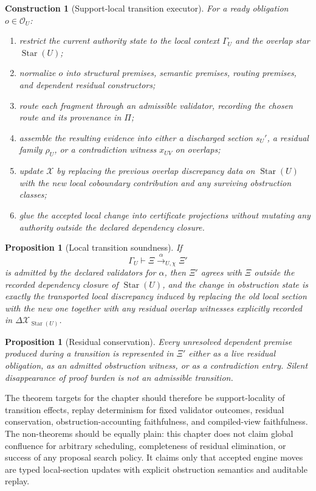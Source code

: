 \documentclass[11pt]{report}
\newtheorem{proposition}[definition]{Proposition}
\newtheorem{construction}[definition]{Construction}
\begin{document}
\begin{construction}[Support-local transition executor]
For a ready obligation $o \in \mathcal{O}_U$:
\begin{enumerate}
\item restrict the current authority state to the local context $\Gamma_U$ and the overlap star $\operatorname{Star}(U)$;
\item normalize $o$ into structural premises, semantic premises, routing premises, and dependent residual constructors;
\item route each fragment through an admissible validator, recording the chosen route and its provenance in $\Pi$;
\item assemble the resulting evidence into either a discharged section $s_U'$, a residual family $\rho_U$, or a contradiction witness $x_{UV}$ on overlaps;
\item update $\mathcal{X}$ by replacing the previous overlap discrepancy data on $\operatorname{Star}(U)$ with the new local coboundary contribution and any surviving obstruction classes;
\item glue the accepted local change into certificate projections without mutating any authority outside the declared dependency closure.
\end{enumerate}
\end{construction}

\begin{proposition}[Local transition soundness]
If
\[
\Gamma_U \vdash \Xi \xrightarrow{\alpha}_{U,\chi} \Xi'
\]
is admitted by the declared validators for $\alpha$, then $\Xi'$ agrees with $\Xi$ outside the recorded dependency closure of $\operatorname{Star}(U)$, and the change in obstruction state is exactly the transported local discrepancy induced by replacing the old local section with the new one together with any residual overlap witnesses explicitly recorded in $\Delta \mathcal{X}_{\operatorname{Star}(U)}$.
\end{proposition}

\begin{proposition}[Residual conservation]
Every unresolved dependent premise produced during a transition is represented in $\Xi'$ either as a live residual obligation, as an admitted obstruction witness, or as a contradiction entry. Silent disappearance of proof burden is not an admissible transition.
\end{proposition}

The theorem targets for the chapter should therefore be support-locality of transition effects, replay determinism for fixed validator outcomes, residual conservation, obstruction-accounting faithfulness, and compiled-view faithfulness. The non-theorems should be equally plain: this chapter does not claim global confluence for arbitrary scheduling, completeness of residual elimination, or success of any proposal search policy. It claims only that accepted engine moves are typed local-section updates with explicit obstruction semantics and auditable replay.
\end{document}
